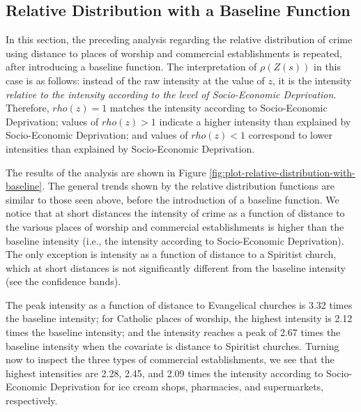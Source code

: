 \documentclass[smallextended]{svjour3}       %
\begin{document}
\hypertarget{relative-distribution-with-a-baseline-function}{%
\subsection{Relative Distribution with a Baseline
Function}\label{relative-distribution-with-a-baseline-function}}

In this section, the preceding analysis regarding the relative
distribution of crime using distance to places of worship and commercial
establishments is repeated, after introducing a baseline function. The
interpretation of \(\rho(Z(s))\) in this case is as follows: instead of
the raw intensity at the value of \(z\), it is the intensity
\emph{relative to the intensity according to the level of Socio-Economic
Deprivation}. Therefore, \(rho(z)=1\) matches the intensity according to
Socio-Economic Deprivation; values of \(rho(z)>1\) indicate a higher
intensity than explained by Socio-Economic Deprivation; and values of
\(rho(z)<1\) correspond to lower intensities than explained by
Socio-Economic Deprivation.

The results of the analysis are shown in Figure
\ref{fig:plot-relative-distribution-with-baseline}. The general trends
shown by the relative distribution functions are similar to those seen
above, before the introduction of a baseline function. We notice that at
short distances the intensity of crime as a function of distance to the
various places of worship and commercial establishments is higher than
the baseline intensity (i.e., the intensity according to Socio-Economic
Deprivation). The only exception is intensity as a function of distance
to a Spiritist church, which at short distances is not significantly
different from the baseline intensity (see the confidence bands).

The peak intensity as a function of distance to Evangelical churches is
3.32 times the baseline intensity; for Catholic places of worship, the
highest intensity is 2.12 times the baseline intensity; and the
intensity reaches a peak of 2.67 times the baseline intensity when the
covariate is distance to Spiritist churches. Turning now to inspect the
three types of commercial establishments, we see that the highest
intensities are 2.28, 2.45, and 2.09 times the intensity according to
Socio-Economic Deprivation for ice cream shops, pharmacies, and
supermarkets, respectively.
\end{document}
